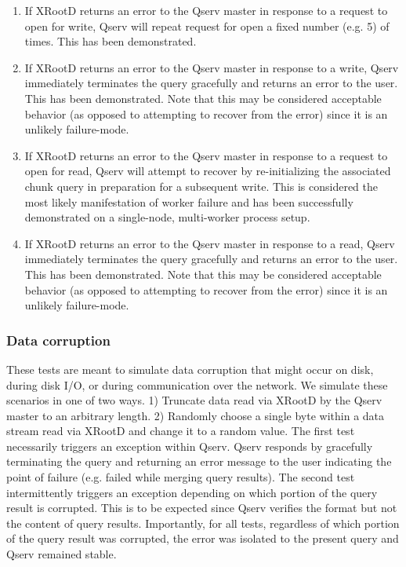 \documentclass[DM,lsstdraft,toc]{lsstdoc}
\begin{document}
\begin{enumerate}
\def\labelenumi{\arabic{enumi}.}
\item
  If XRootD returns an error to the Qserv
  master in response to a request to open for write, Qserv will repeat
  request for open a fixed number (e.g. 5) of times. This has been
  demonstrated.
\item
  If XRootD returns an error to the Qserv
  master in response to a write, Qserv immediately terminates the query
  gracefully and returns an error to the user. This has been
  demonstrated. Note that this may be considered acceptable behavior (as
  opposed to attempting to recover from the error) since it is an
  unlikely failure-mode.
\item
  If XRootD returns an error to the Qserv
  master in response to a request to open for read, Qserv will attempt
  to recover by re-initializing the associated chunk query in
  preparation for a subsequent write. This is considered the most likely
  manifestation of worker failure and has been successfully demonstrated
  on a single-node, multi-worker process setup.
\item
  If XRootD returns an error to the Qserv
  master in response to a read, Qserv immediately terminates the query
  gracefully and returns an error to the user. This has been
  demonstrated. Note that this may be considered acceptable behavior (as
  opposed to attempting to recover from the error) since it is an
  unlikely failure-mode.
\end{enumerate}

\subsubsection{Data corruption}\label{data-corruption}

These tests are meant to simulate data corruption that might occur on
disk, during disk I/O, or during communication over the network. We
simulate these scenarios in one of two ways. 1) Truncate data read via
XRootD by the Qserv master to an arbitrary
length. 2) Randomly choose a single byte within a data stream read via
XRootD and change it to a random value. The
first test necessarily triggers an exception within Qserv. Qserv
responds by gracefully terminating the query and returning an error
message to the user indicating the point of failure (e.g. failed while
merging query results). The second test intermittently triggers an
exception depending on which portion of the query result is corrupted.
This is to be expected since Qserv verifies the format but not the
content of query results. Importantly, for all tests, regardless of
which portion of the query result was corrupted, the error was isolated
to the present query and Qserv remained stable.
\end{document}

